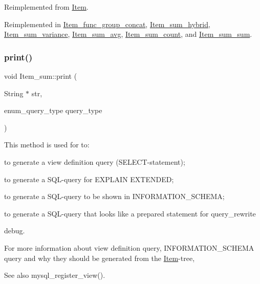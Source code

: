 Reimplemented from \mbox{\hyperlink{classItem}{Item}}.



Reimplemented in \mbox{\hyperlink{classItem__func__group__concat_a89dcd722bccaa2c1b16d972ce823087f}{Item\+\_\+func\+\_\+group\+\_\+concat}}, \mbox{\hyperlink{classItem__sum__hybrid_a7b06af139e0b7f7b0153252aa8f2e992}{Item\+\_\+sum\+\_\+hybrid}}, \mbox{\hyperlink{classItem__sum__variance_a510a0268827bac0bf1fc4cf933813745}{Item\+\_\+sum\+\_\+variance}}, \mbox{\hyperlink{classItem__sum__avg_ab4cfa5a3c42abc40f7f3fdb95c92d568}{Item\+\_\+sum\+\_\+avg}}, \mbox{\hyperlink{classItem__sum__count_a74ba6f4c6812411fa43d9d942d949863}{Item\+\_\+sum\+\_\+count}}, and \mbox{\hyperlink{classItem__sum__sum_aa610e5d4e5371dcea4625416d7d79d93}{Item\+\_\+sum\+\_\+sum}}.

\mbox{\label{classItem__sum_a0c176fad01253e4a168d0956eb1f6fc5}} 
\subsubsection{\texorpdfstring{print()}{print()}}
{\footnotesize\ttfamily void Item\+\_\+sum\+::print (\begin{DoxyParamCaption}\item[{String $\ast$}]{str,  }\item[{enum\+\_\+query\+\_\+type}]{query\+\_\+type }\end{DoxyParamCaption})\hspace{0.3cm}{\ttfamily [virtual]}}

This method is used for to\+:
\begin{DoxyItemize}
\item to generate a view definition query (S\+E\+L\+E\+CT-\/statement);
\item to generate a S\+QL-\/query for E\+X\+P\+L\+A\+IN E\+X\+T\+E\+N\+D\+ED;
\item to generate a S\+QL-\/query to be shown in I\+N\+F\+O\+R\+M\+A\+T\+I\+O\+N\+\_\+\+S\+C\+H\+E\+MA;
\item to generate a S\+QL-\/query that looks like a prepared statement for query\+\_\+rewrite
\item debug.
\end{DoxyItemize}

For more information about view definition query, I\+N\+F\+O\+R\+M\+A\+T\+I\+O\+N\+\_\+\+S\+C\+H\+E\+MA query and why they should be generated from the \mbox{\hyperlink{classItem}{Item}}-\/tree, \begin{DoxySeeAlso}{See also}
mysql\+\_\+register\+\_\+view(). 
\end{DoxySeeAlso}


